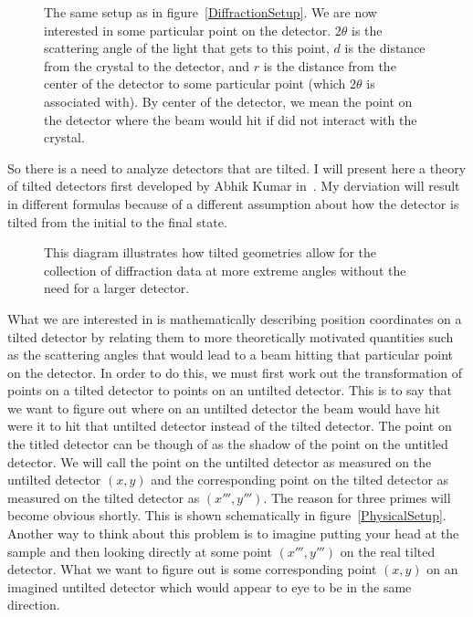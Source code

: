 \begin{SCfigure}[1][htbp]
    \centering
    
    \caption{The same setup as in figure~\ref{DiffractionSetup}. 
    We are now interested in some particular point on the 
    detector. $2\theta$ is the scattering angle of the light
    that gets to this point, $d$ is the distance 
    from the crystal to the detector, and $r$ is the distance 
    from the center of the detector to some particular point 
    (which $2\theta$ is associated with). By center 
    of the detector, we mean the point on the detector where 
    the beam would hit if did not interact with the crystal.}
    \label{MeasureAngleFlatDetector}
\end{SCfigure}

So there is a need to analyze detectors that are 
tilted. I will present here a theory of tilted detectors 
first developed by Abhik Kumar in~\cite{Kumar05}.
 My derviation will result in 
different formulas because of a different assumption
about how the detector is tilted from the initial to
the final state.

\begin{SCfigure}[1][htbp]
    \centering
    
    \caption{This diagram illustrates how tilted geometries 
    allow for the collection of diffraction data at more 
    extreme angles without the need for a larger detector.}
    \label{HigherQValues}
\end{SCfigure}

What we are interested in is mathematically describing 
position coordinates on a tilted detector by relating 
them to more theoretically motivated quantities such as 
the scattering angles that would lead to a beam hitting
that particular point on the detector. 
In order to do this, we must first work
out the transformation of points on a tilted detector
to points on an untilted detector. This is to say
that we want to figure out where on an untilted 
detector the beam would have hit were it to hit
that untilted detector instead of the tilted detector.
The point on the titled detector can be though of
as the shadow of the point on the untitled detector.
We will call the point on the untilted detector
as measured on the untilted detector $(x,y)$ 
and the corresponding point on the tilted detector
as measured on the tilted detector as $(x''',y''')$. 
The reason for three primes will become obvious
shortly. This is shown schematically in 
figure~\ref{PhysicalSetup}. Another way to think
about this problem is to imagine putting your 
head at the sample and then looking directly 
at some point $(x''',y''')$ on the real
tilted detector. What we want to figure out
is some corresponding point $(x,y)$ on an 
imagined untilted 
detector which would appear to eye to be 
in the same direction.

